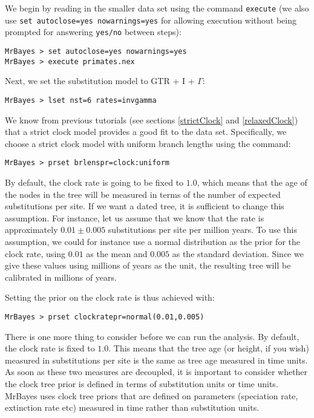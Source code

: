 \documentclass[12pt]{book}
\begin{document}
We begin by reading in the smaller data set using the command \texttt{execute} (we also use
\texttt{set autoclose=yes nowarnings=yes} for allowing execution without being prompted for
answering \texttt{yes/no} between steps):

\begin{Verbatim}
MrBayes > set autoclose=yes nowarnings=yes
MrBayes > execute primates.nex
\end{Verbatim}

Next, we set the substitution model to GTR + I + $\Gamma$:

\begin{Verbatim}
MrBayes > lset nst=6 rates=invgamma
\end{Verbatim}

We know from previous tutorials (see sections \ref{strictClock} and \ref{relaxedClock}) that a
strict clock model provides a good fit to the data set. Specifically, we choose a strict clock
model with uniform branch lengths using the command:

\begin{Verbatim}
MrBayes > prset brlenspr=clock:uniform
\end{Verbatim}

By default, the clock rate is going to be fixed to $1.0$, which means that the age of the nodes in
the tree will be measured in terms of the number of expected substitutions per site. If we want a
dated tree, it is sufficient to change this assumption. For instance, let us assume that we know
that the rate is approximately $0.01 \pm 0.005$ substitutions per site per million years. To use
this assumption, we could for instance use a normal distribution as the prior for the clock rate,
using $0.01$ as the mean and $0.005$ as the standard deviation. Since we give these values using
millions of years as the unit, the resulting tree will be calibrated in millions of years.

Setting the prior on the clock rate is thus achieved with:

\begin{Verbatim}
MrBayes > prset clockratepr=normal(0.01,0.005)
\end{Verbatim}

There is one more thing to consider before we can run the analysis. By default, the clock rate is
fixed to $1.0$. This means that the tree age (or height, if you wish) measured in substitutions per
site is the same as tree age measured in time units. As soon as these two measures are decoupled,
it is important to consider whether the clock tree prior is defined in terms of substitution units
or time units. MrBayes uses clock tree priors that are defined on parameters (speciation rate,
extinction rate etc) measured in time rather than substitution units.
\end{document}
